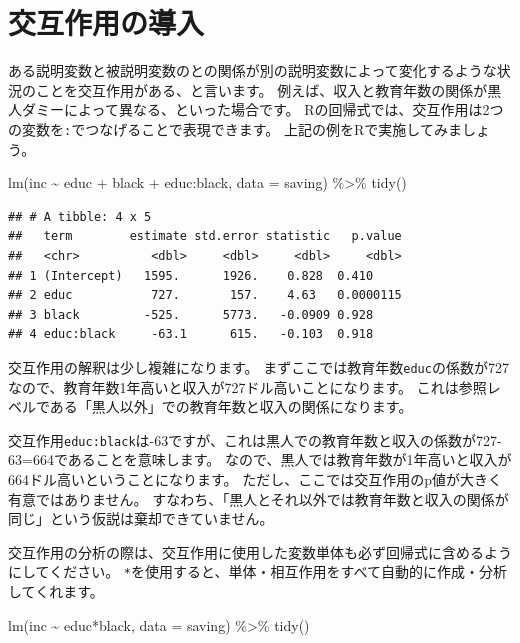 \documentclass[
]{book}
\newenvironment{Shaded}{\begin{snugshade}}{\end{snugshade}}
\newcommand{\AttributeTok}[1]{\textcolor[rgb]{0.77,0.63,0.00}{#1}}
\newcommand{\FunctionTok}[1]{\textcolor[rgb]{0.00,0.00,0.00}{#1}}
\newcommand{\NormalTok}[1]{#1}
\newcommand{\SpecialCharTok}[1]{\textcolor[rgb]{0.00,0.00,0.00}{#1}}
\begin{document}
\hypertarget{ux4ea4ux4e92ux4f5cux7528ux306eux5c0eux5165}{%
\section{交互作用の導入}\label{ux4ea4ux4e92ux4f5cux7528ux306eux5c0eux5165}}

ある説明変数と被説明変数のとの関係が別の説明変数によって変化するような状況のことを交互作用がある、と言います。
例えば、収入と教育年数の関係が黒人ダミーによって異なる、といった場合です。
Rの回帰式では、交互作用は2つの変数を\texttt{:}でつなげることで表現できます。
上記の例をRで実施してみましょう。

\begin{Shaded}
\begin{Highlighting}[]
\FunctionTok{lm}\NormalTok{(inc }\SpecialCharTok{\textasciitilde{}}\NormalTok{ educ }\SpecialCharTok{+}\NormalTok{ black }\SpecialCharTok{+}\NormalTok{ educ}\SpecialCharTok{:}\NormalTok{black, }\AttributeTok{data =}\NormalTok{ saving) }\SpecialCharTok{\%\textgreater{}\%}
  \FunctionTok{tidy}\NormalTok{()}
\end{Highlighting}
\end{Shaded}

\begin{verbatim}
## # A tibble: 4 x 5
##   term        estimate std.error statistic   p.value
##   <chr>          <dbl>     <dbl>     <dbl>     <dbl>
## 1 (Intercept)   1595.      1926.    0.828  0.410    
## 2 educ           727.       157.    4.63   0.0000115
## 3 black         -525.      5773.   -0.0909 0.928    
## 4 educ:black     -63.1      615.   -0.103  0.918
\end{verbatim}

交互作用の解釈は少し複雑になります。
まずここでは教育年数\texttt{educ}の係数が727なので、教育年数1年高いと収入が727ドル高いことになります。
これは参照レベルである「黒人以外」での教育年数と収入の関係になります。

交互作用\texttt{educ:black}は-63ですが、これは黒人での教育年数と収入の係数が727-63=664であることを意味します。
なので、黒人では教育年数が1年高いと収入が664ドル高いということになります。
ただし、ここでは交互作用のp値が大きく有意ではありません。
すなわち、「黒人とそれ以外では教育年数と収入の関係が同じ」という仮説は棄却できていません。

交互作用の分析の際は、交互作用に使用した変数単体も必ず回帰式に含めるようにしてください。
\texttt{*}を使用すると、単体・相互作用をすべて自動的に作成・分析してくれます。

\begin{Shaded}
\begin{Highlighting}[]
\FunctionTok{lm}\NormalTok{(inc }\SpecialCharTok{\textasciitilde{}}\NormalTok{ educ}\SpecialCharTok{*}\NormalTok{black, }\AttributeTok{data =}\NormalTok{ saving) }\SpecialCharTok{\%\textgreater{}\%}
  \FunctionTok{tidy}\NormalTok{()}
\end{Highlighting}
\end{Shaded}
\end{document}
